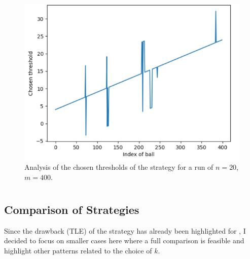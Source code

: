 \begin{figure}[h]
    \centering
    \includegraphics[scale=0.6]{Chapter4/Figs/dqn_learnt_thresholds.png}
    \caption{Analysis of the chosen thresholds of the \DQN strategy for a run of $n=20$, $m=400$.}
    \label{two-thinning-dqn-thresholds}
\end{figure}



\section{\KThinning}



\subsection{Comparison of Strategies}


Since the drawback (TLE) of the \DP strategy has already been highlighted for \TwoThinning, I decided to focus on smaller cases here where a full comparison is feasible and highlight other patterns related to the choice of $k$.



